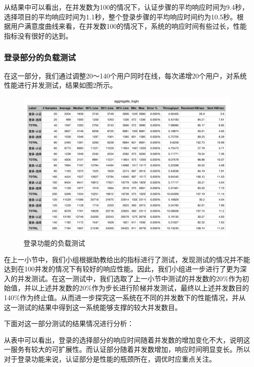 \documentclass[hyperref, a4paper]{ctexart}
\begin{document}
从结果中可以看出，在并发数为100的情况下，认证步骤的平均响应时间为9.4秒，选择项目的平均响应时间为1.1秒，整个登录步骤的平均响应时间约为10.5秒。根据用户满意度曲线来看，在并发数100的情况下，系统的响应时间有些过长，性能指标没有很好的达到。

\hypertarget{ux767bux5f55ux90e8ux5206ux7684ux8d1fux8f7dux6d4bux8bd5}{%
\subsubsection{登录部分的负载测试}\label{ux767bux5f55ux90e8ux5206ux7684ux8d1fux8f7dux6d4bux8bd5}}

在这一部分，我们通过调整20～140个用户同时在线，每次递增20个用户，对系统性能进行并发测试，结果如图2所示。

\begin{figure}
\centering
\includegraphics{resources/wcn/login_aggregate.png}
\caption{登录功能的负载测试}
\end{figure}

在上一小节中，我们小组根据助教给出的指标进行了测试，发现测试的情况并不能达到在100并发的情况下有较好的响应性能。因此，我们小组进一步进行了更为深入的并发测试。在这一测试中，我们选取了上一小节中测试的并发数的20\%作为初始值，并以上述并发数的20\%作为步长进行阶梯并发测试，最终以上述并发数目的140\%作为终止值。从而进一步探究这一系统在不同的并发数下的性能情况，并从这一测试的结果中得到这一系统能够支撑的较大并发数目。

下面对这一部分测试的结果情况进行分析：

从表中可以看出，登录的选择部分的响应时间随着并发数的增加变化不大，说明这一服务有较大的可扩展性。而认证部分随着并发数增加，响应时间明显变长。所以对于登录功能来说，认证部分是性能的瓶颈所在，调优时应重点关注。
\end{document}
